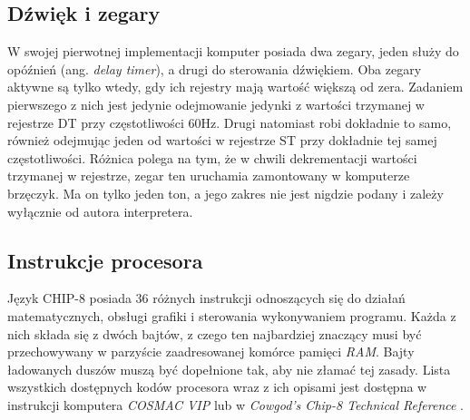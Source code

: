 \subsection{Dźwięk i zegary}
 W swojej pierwotnej implementacji komputer posiada dwa zegary, jeden służy do opóźnień (ang. \textit{delay timer}), a drugi do sterowania dźwiękiem. Oba zegary aktywne są tylko wtedy, gdy ich rejestry mają wartość większą od zera. Zadaniem pierwszego z nich jest jedynie odejmowanie jedynki z wartości trzymanej w rejestrze DT przy częstotliwości 60Hz. Drugi natomiast robi dokładnie to samo, również odejmując jeden od wartości w rejestrze ST przy dokładnie tej samej częstotliwości. Różnica polega na tym, że w chwili dekrementacji wartości trzymanej w rejestrze, zegar ten uruchamia zamontowany w komputerze brzęczyk. Ma on tylko jeden ton, a jego zakres nie jest nigdzie podany i zależy wyłącznie od autora interpretera.
 
\subsection{Instrukcje procesora}
Język CHIP-8 posiada 36 różnych instrukcji odnoszących się do działań matematycznych, obsługi grafiki i sterowania wykonywaniem programu. Każda z nich składa się z dwóch bajtów, z czego ten najbardziej znaczący musi być przechowywany w parzyście zaadresowanej komórce pamięci \textit{RAM}. Bajty ładowanych duszów muszą być dopełnione tak, aby nie złamać tej zasady. Lista wszystkich dostępnych kodów procesora wraz z ich opisami jest dostępna w instrukcji komputera \textit{COSMAC VIP} \cite{COSMAC} lub w \textit{Cowgod’s Chip-8 Technical Reference} \cite{Cowgod}.